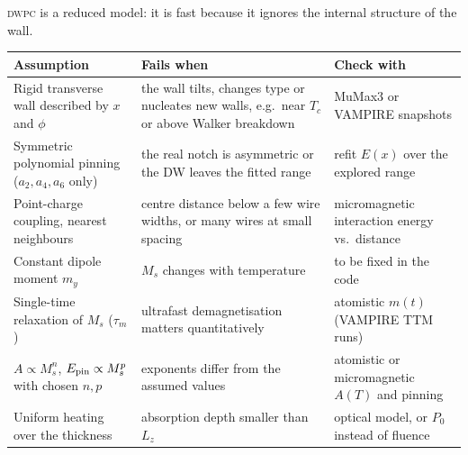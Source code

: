 \documentclass[11pt,a4paper]{report}
\newcommand{\dwpc}{\textsc{dwpc}}
\begin{document}
\dwpc{} is a reduced model: it is fast because it ignores the internal structure of the wall.
\begin{center}\small
\begin{tabularx}{\textwidth}{@{}>{\raggedright}X >{\raggedright}X >{\raggedright\arraybackslash}X@{}}
\toprule Assumption & Fails when & Check with\\\midrule
Rigid transverse wall described by $x$ and $\phi$ & the wall tilts, changes type or nucleates new walls, e.g.\ near $T_c$ or above Walker breakdown & MuMax3 or VAMPIRE snapshots\\
Symmetric polynomial pinning ($a_2,a_4,a_6$ only) & the real notch is asymmetric or the DW leaves the fitted range & refit $E(x)$ over the explored range\\
Point-charge coupling, nearest neighbours & centre distance below a few wire widths, or many wires at small spacing & micromagnetic interaction energy vs.\ distance\\
Constant dipole moment $m_y$ & $M_s$ changes with temperature & to be fixed in the code\\
Single-time relaxation of $M_s$ ($\tau_m$) & ultrafast demagnetisation matters quantitatively & atomistic $m(t)$ (VAMPIRE TTM runs)\\
$A\propto M_s^n$, $E_{\rm pin}\propto M_s^p$ with chosen $n,p$ & exponents differ from the assumed values & atomistic or micromagnetic $A(T)$ and pinning\\
Uniform heating over the thickness & absorption depth smaller than $L_z$ & optical model, or $P_0$ instead of fluence\\
\bottomrule
\end{tabularx}
\end{center}

\iffalse
\end{document}
